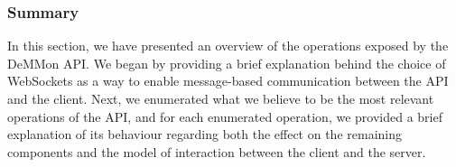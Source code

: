 
\subsubsection{Summary}

In this section, we have presented an overview of the operations exposed by the DeMMon API. We began by providing a brief explanation behind the choice of WebSockets \cite{websocketsRFC} as a way to enable message-based communication between the API and the client. Next, we enumerated what we believe to be the most relevant operations of the API, and for each enumerated operation, we provided a brief explanation of its behaviour regarding both the effect on the remaining components and the model of interaction between the client and the server. 